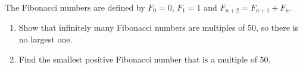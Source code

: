 The Fibonacci numbers are defined by $F_0=0$, $F_1=1$ and $F_{n+2}=F_{n+1}+F_n$.
\begin{enumerate}
\item[(a)] Show that infinitely many Fibonacci numbers are multiples of $50$, so there is no largest one.
\item[(b)] Find the smallest positive Fibonacci number that is a multiple of $50$.
\end{enumerate}
